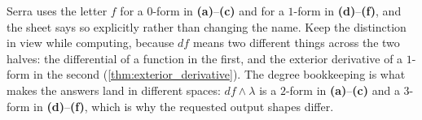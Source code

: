\begin{ainote}
Serra uses the letter $f$ for a $0$-form in \textbf{(a)}--\textbf{(c)} and for a $1$-form in
\textbf{(d)}--\textbf{(f)}, and the sheet says so explicitly rather than changing the name. Keep
the distinction in view while computing, because $df$ means two different things across the two
halves: the differential of a function in the first, and the exterior derivative of a $1$-form in
the second (\cref{thm:exterior_derivative}). The degree bookkeeping is what makes the answers land
in different spaces: $df\wedge\lambda$ is a $2$-form in \textbf{(a)}--\textbf{(c)} and a $3$-form
in \textbf{(d)}--\textbf{(f)}, which is why the requested output shapes differ.
\end{ainote}

